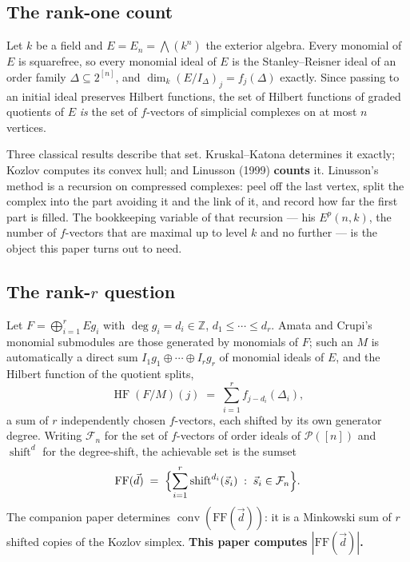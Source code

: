 \documentclass[11pt, a4paper, abstract=yes]{scrartcl}
\theoremstyle{definition}
\theoremstyle{remark}
\theoremstyle{plain}
\newcommand{\shift}{\operatorname{shift}}
\newcommand{\conv}{\operatorname{conv}}
\newcommand{\HF}{\operatorname{HF}}
\begin{document}
\subsection{The rank-one count}
\label{sec:orgdd6a8db}

Let \(k\) be a field and \(E=E_n=\bigwedge(k^n)\) the exterior algebra. Every monomial of \(E\) is
squarefree, so every monomial ideal of \(E\) is the Stanley--Reisner ideal \autocite{Stanley1996} of an order
family \(\Delta\subseteq2^{[n]}\), and \(\dim_k(E/I_\Delta)_j=f_j(\Delta)\) exactly. Since passing to
an initial ideal preserves Hilbert functions, the set of Hilbert functions of graded quotients of
\(E\) \emph{is} the set of \(f\)-vectors of simplicial complexes on at most \(n\) vertices.

Three classical results describe that set. Kruskal--Katona \autocite{Kruskal1963,Katona1968} determines it exactly; Kozlov \textcite{Kozlov1997}
computes its convex hull; and Linusson (1999) \textbf{counts} it. Linusson's method is a recursion on
compressed complexes: peel off the last vertex, split the complex into the part avoiding it and the
link of it, and record how far the first part is filled. The bookkeeping variable of that recursion
--- his \(E^p(n,k)\), the number of \(f\)-vectors that are maximal up to level \(k\) and no further
--- is the object this paper turns out to need.
\subsection{The rank-\(r\) question}
\label{sec:org959e367}

Let \(F=\bigoplus_{i=1}^rEg_i\) with \(\deg g_i=d_i\in\mathbb Z\), \(d_1\le\cdots\le d_r\). Amata and
Crupi's monomial submodules are those generated by monomials of \(F\); such an \(M\) is automatically
a direct sum \(I_1g_1\oplus\cdots\oplus I_rg_r\) of monomial ideals of \(E\), and the Hilbert function
of the quotient splits,
\begin{equation}\label{eq:auto-1}
  \HF(F/M)(j)\;=\;\sum_{i=1}^{r}f_{j-d_i}(\Delta_i),
\end{equation}
a sum of \(r\) independently chosen \(f\)-vectors, each shifted by its own generator degree. Writing
\(\mathcal F_n\) for the set of \(f\)-vectors of order ideals of \(\mathcal P([n])\) and
\(\shift^d\) for the degree-shift, the achievable set is the sumset
\begin{equation}\label{eq:auto-2}
  \mathrm{FF}(\vec d)\;=\;\Bigl\lbrace\sum_{i=1}^{r}\shift^{d_i}(\vec s_i)\;:\;\vec s_i\in\mathcal F_n\Bigr\rbrace .
\end{equation}
The companion paper \textcite{SnellmanArticle1} determines \(\conv(\mathrm{FF}(\vec d))\): it is a Minkowski sum of \(r\) shifted copies
of the Kozlov simplex. \textbf{This paper computes \(|\mathrm{FF}(\vec d)|\).}
\end{document}
